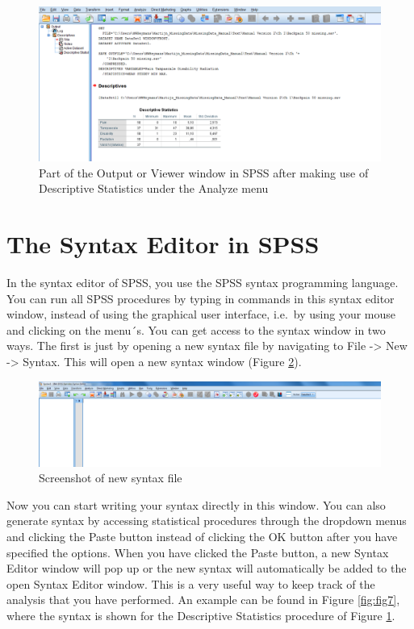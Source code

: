 \documentclass[]{book}
\theoremstyle{definition}
\theoremstyle{definition}
\theoremstyle{definition}
\theoremstyle{remark}
\begin{document}
\begin{figure}

{\centering \includegraphics[width=0.9\linewidth]{images/fig1.5} 

}

\caption{Part of the Output or Viewer window in SPSS after making use of Descriptive Statistics under the Analyze menu}\label{fig:fig5}
\end{figure}

\section{The Syntax Editor in SPSS}\label{the-syntax-editor-in-spss}

In the syntax editor of SPSS, you use the SPSS syntax programming
language. You can run all SPSS procedures by typing in commands in this
syntax editor window, instead of using the graphical user interface,
i.e.~by using your mouse and clicking on the menu´s. You can get access
to the syntax window in two ways. The first is just by opening a new
syntax file by navigating to File -\textgreater{} New -\textgreater{}
Syntax. This will open a new syntax window (Figure \ref{fig:fig6}).

\begin{figure}

{\centering \includegraphics[width=0.9\linewidth]{images/fig1.6} 

}

\caption{Screenshot of new syntax file}\label{fig:fig6}
\end{figure}

Now you can start writing your syntax directly in this window. You can
also generate syntax by accessing statistical procedures through the
dropdown menus and clicking the Paste button instead of clicking the OK
button after you have specified the options. When you have clicked the
Paste button, a new Syntax Editor window will pop up or the new syntax
will automatically be added to the open Syntax Editor window. This is a
very useful way to keep track of the analysis that you have performed.
An example can be found in Figure \ref{fig:fig7}, where the syntax is
shown for the Descriptive Statistics procedure of Figure \ref{fig:fig5}.
\end{document}
